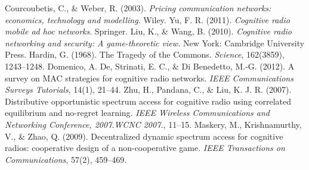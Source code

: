 \begin{thebibliography}{1}
 Courcoubetis, C., \& Weber, R. (2003). \textit{Pricing communication networks: economics, technology and modelling}. Wiley.
 Yu, F. R. (2011). \textit{Cognitive radio mobile ad hoc networks}.  Springer.
 Liu, K., \& Wang, B. (2010). \textit{Cognitive radio networking and security: A game-theoretic view.} New York: Cambridge University Press.
 Hardin, G. (1968). The Tragedy of the Commons. \textit{Science}, 162(3859), 1243–1248.
 Domenico, A. De, Strinati, E. C., \& Di Benedetto, M.-G. (2012). A survey on MAC strategies for cognitive radio networks. \textit{IEEE Communications Surveys Tutorials}, 14(1), 21–44.
 Zhu, H., Pandana, C., \& Liu, K. J. R. (2007). Distributive opportunistic spectrum access for cognitive radio using correlated equilibrium and no-regret learning. \textit{IEEE Wireless Communications and Networking Conference, 2007.WCNC 2007.}, 11–15.
 Maskery, M., Krishnamurthy, V., \& Zhao, Q. (2009). Decentralized dynamic spectrum access for cognitive radios: cooperative design of a non-cooperative game. \textit{IEEE Transactions on Communications}, 57(2), 459–469.


\end{thebibliography}
